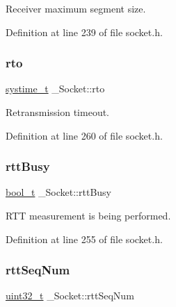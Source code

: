 Receiver maximum segment size. 



Definition at line 239 of file socket.\+h.

\mbox{\label{struct__Socket_adce7f8cd17fecf3025e8333b0110397b}} 
\subsubsection{\texorpdfstring{rto}{rto}}
{\footnotesize\ttfamily \hyperlink{compiler__port_8h_ae3e32a98d431a02106616da3071832dd}{systime\+\_\+t} \+\_\+\+Socket\+::rto}



Retransmission timeout. 



Definition at line 260 of file socket.\+h.

\mbox{\label{struct__Socket_a2ee8d1d7d2c17888f9b87ca8646cb4bb}} 
\subsubsection{\texorpdfstring{rtt\+Busy}{rttBusy}}
{\footnotesize\ttfamily \hyperlink{compiler__port_8h_a812d16e5494522586b3784e55d479912}{bool\+\_\+t} \+\_\+\+Socket\+::rtt\+Busy}



R\+TT measurement is being performed. 



Definition at line 255 of file socket.\+h.

\mbox{\label{struct__Socket_ad8aba43068f28bc601d677e04a9d6995}} 
\subsubsection{\texorpdfstring{rtt\+Seq\+Num}{rttSeqNum}}
{\footnotesize\ttfamily \hyperlink{stdint_8h_a435d1572bf3f880d55459d9805097f62}{uint32\+\_\+t} \+\_\+\+Socket\+::rtt\+Seq\+Num}



